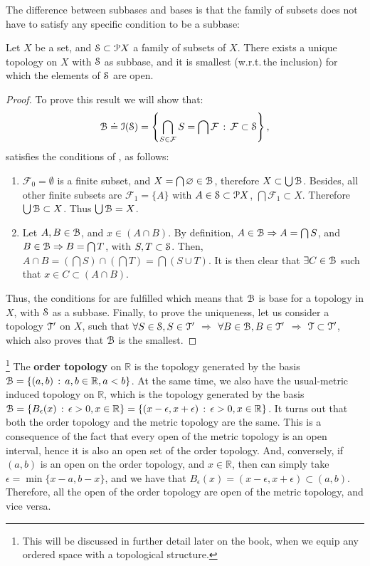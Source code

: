 The difference between subbases and bases is that the family of subsets does not have
to satisfy any specific condition to be a subbase:

\begin{theorem}
	Let $X$ be a set, and $\S\subset \P X$ a family of subsets of $X$.
	There exists a unique topology on $X$ with $\S$ as subbase, and it is smallest
	(w.r.t.\,the inclusion) for which the elements of $\S$ are open.
	\label{th:1-4}
\end{theorem}

\begin{proof}
	To prove this result we will show that:
	\[
	\B\doteq \I(\S)=\left\{\bigcap_{S\in\mathcal{F}} S=\bigcap\mathcal{F}\,:\,\mathcal{F}\subset \S\right\},
	\]
	satisfies the conditions of , as follows:
	\begin{enumerate}
		\item $\mathcal{F}_{0}=\emptyset$ is a finite subset, and $X=\bigcap \emptyset\in\B$, therefore $X\subset
		\bigcup\B$.
		Besides, all other finite subsets are $\mathcal{F}_{1}=\{A\}$ with $A\in\S
		\subset\P X$, $\bigcap\mathcal{F}_{1}\subset X$.
		Therefore $\bigcup \B\subset X$.
		Thus $\bigcup\B = X$.
		\item Let $A, B\in \B$, and $x\in (A\cap B)$.
		By definition, $A\in\B \Rightarrow A=\bigcap S$,
		and $B\in \B \Rightarrow B =\bigcap T$, with $S, T\subset \S$.
		Then, $A\cap B = \left(\bigcap S\right)\cap\left(\bigcap T\right)=\bigcap (S\cup T)$.
		It is then clear that $\exists C\in\B$ such that $x\in C\subset (A\cap B)$.
	\end{enumerate}
	Thus, the conditions for  are fulfilled which means that
	$\B$ is base for a topology in $X$, with $\S$ as a subbase.
	Finally, to prove the uniqueness, let us consider a topology $\T'$ on $X$, 
	such that $\forall S\in \S, S\in \T'$ $\Rightarrow$ $\forall B\in\B, B\in\T'$ 
	$\Rightarrow$ $\T\subset \T'$, which also proves that $\B$ is the smallest.
\end{proof}

\begin{example}
	\footnote{This will be discussed in further detail later on the book, when
	we equip any ordered space with a topological structure.}
	The \textbf{order topology} on $\mathbb{R}$ is the topology generated by the
	basis $\B=\setdef{(a,b)}{a,b\in\mathbb{R}, a<b}$. At the same time, we also have
	the usual-metric induced topology on $\mathbb{R}$, which is the topology
	generated by the basis $\B=\setdef{B_\epsilon(x)}{\epsilon>0, x\in\mathbb{R}} = \setdef{(x-\epsilon, x+\epsilon)}{\epsilon>0, x\in\mathbb{R}}$.
	It turns out that both the order topology and the metric topology are the same.
	This is a consequence of the fact that every open of the metric topology is an
	open interval, hence it is also an open set of the order topology. And, conversely,
	if $(a,b)$ is an open on the order topology, and $x\in\mathbb{R}$, then can simply
	take $\epsilon=\min\{x-a, b-x\}$, and we have that $B_\epsilon(x)=(x-\epsilon, x+\epsilon)\subset (a,b)$.
	Therefore, all the open of the order topology are open of the metric topology, and
	vice versa.
\end{example}

